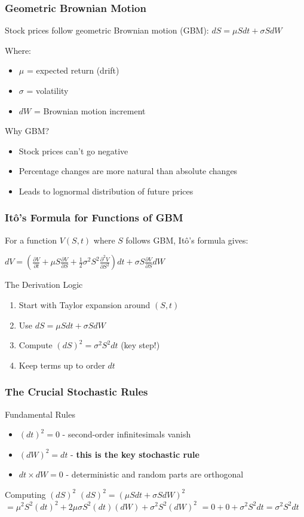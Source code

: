 \documentclass{beamer}
\begin{document}
\begin{frame}
\frametitle{Geometric Brownian Motion}
Stock prices follow geometric Brownian motion (GBM):
$dS = \mu S dt + \sigma S dW$

Where:
\begin{itemize}
\item $\mu$ = expected return (drift)
\item $\sigma$ = volatility
\item $dW$ = Brownian motion increment
\end{itemize}

\begin{block}{Why GBM?}
\begin{itemize}
\item Stock prices can't go negative
\item Percentage changes are more natural than absolute changes
\item Leads to lognormal distribution of future prices
\end{itemize}
\end{block}
\end{frame}

\begin{frame}
\frametitle{Itô's Formula for Functions of GBM}
For a function $V(S,t)$ where $S$ follows GBM, Itô's formula gives:

$dV = \left(\frac{\partial V}{\partial t} + \mu S \frac{\partial V}{\partial S} + \frac{1}{2}\sigma^2 S^2 \frac{\partial^2 V}{\partial S^2}\right) dt + \sigma S \frac{\partial V}{\partial S} dW$

\begin{block}{The Derivation Logic}
\begin{enumerate}
\item Start with Taylor expansion around $(S,t)$
\item Use $dS = \mu S dt + \sigma S dW$
\item Compute $(dS)^2 = \sigma^2 S^2 dt$ (key step!)
\item Keep terms up to order $dt$
\end{enumerate}
\end{block}
\end{frame}

\begin{frame}
\frametitle{The Crucial Stochastic Rules}
\begin{block}{Fundamental Rules}
\begin{itemize}
\item $(dt)^2 = 0$ - second-order infinitesimals vanish
\item $(dW)^2 = dt$ - \textbf{this is the key stochastic rule}
\item $dt \times dW = 0$ - deterministic and random parts are orthogonal
\end{itemize}
\end{block}

\begin{block}{Computing $(dS)^2$}
$(dS)^2 = (\mu S dt + \sigma S dW)^2$
$= \mu^2 S^2 (dt)^2 + 2\mu\sigma S^2 (dt)(dW) + \sigma^2 S^2 (dW)^2$
$= 0 + 0 + \sigma^2 S^2 dt = \sigma^2 S^2 dt$
\end{block}
\end{frame}
\end{document}
